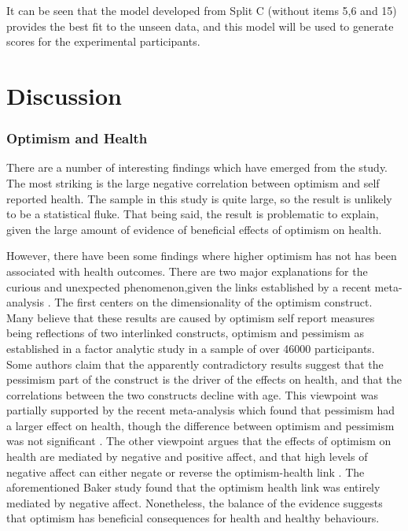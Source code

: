 \documentclass{article}
\begin{document}
It can be seen that the model developed from Split C (without items 5,6 and 15) provides the best fit to the unseen data, and this model will be used to generate scores for the experimental participants. 
\part{Discussion}

\section{Optimism and Health}
\label{sec:optimism-health-1}



There are a number of interesting findings which have emerged from
the study.  The most striking is the large negative correlation between
optimism and self reported health.  The sample in this study is quite
large, so the result is unlikely to be a statistical fluke.  That being
said, the result is problematic to explain, given the large amount
of evidence of beneficial effects of optimism on health\cite{rasmussen2009optimism}.

However, there have been some findings where higher optimism
has not has been associated with health outcomes.  There are two major
explanations for the curious and unexpected phenomenon,given the links
established by a recent meta-analysis \cite{rasmussen2009optimism}.
The first centers on the dimensionality of the optimism construct.
Many believe that these results are caused by optimism self report
measures being reflections of two interlinked constructs, optimism
and pessimism \cite{Herzberg2006} as established in a factor analytic
study in a sample of over 46000 participants.  Some authors claim that
the apparently contradictory results suggest that the pessimism part
of the construct is the driver of the effects on health, and that
the correlations between the two constructs decline with age.  This
viewpoint was partially supported by the recent meta-analysis which
found that pessimism had a larger effect on health, though the difference
between optimism and pessimism was not significant \cite{rasmussen2009optimism}.
The other viewpoint argues that the effects of optimism on health
are mediated by negative and positive affect, and that high levels
of negative affect can either negate or reverse the optimism-health
link \cite{Baker2007}.  The aforementioned Baker study found that
the optimism health link was entirely mediated by negative affect.
Nonetheless, the balance of the evidence suggests that optimism has
beneficial consequences for health and healthy behaviours.
\end{document}
